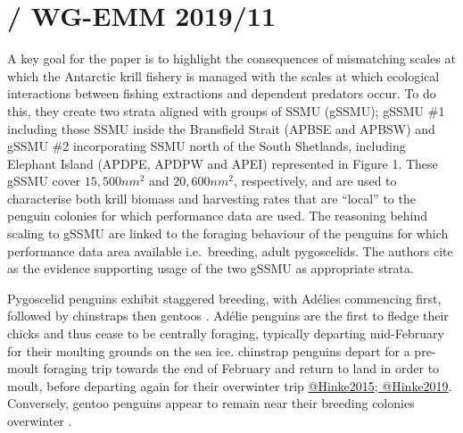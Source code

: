 \documentclass[]{elsarticle} %
\begin{document}
\section{\texorpdfstring{\citet{Watters2020} / WG-EMM
2019/11}{@Watters2020 / WG-EMM 2019/11}}\label{watters2020-wg-emm-201911}

A key goal for the paper is to highlight the consequences of mismatching
scales at which the Antarctic krill fishery is managed with the scales
at which ecological interactions between fishing extractions and
dependent predators occur. To do this, they create two strata aligned
with groups of SSMU (gSSMU); gSSMU \#1 including those SSMU inside the
Bransfield Strait (APBSE and APBSW) and gSSMU \#2 incorporating SSMU
north of the South Shetlands, including Elephant Island (APDPE, APDPW
and APEI) represented in Figure 1. These gSSMU cover \(15,500nm^2\) and
\(20,600nm^2\), respectively, and are used to characterise both krill
biomass and harvesting rates that are ``local'' to the penguin colonies
for which performance data are used. The reasoning behind scaling to
gSSMU are linked to the foraging behaviour of the penguins for which
performance data area available i.e.~breeding, adult pygoscelids. The
authors cite \citet{Hinke2017} as the evidence supporting usage of the
two gSSMU as appropriate strata.

Pygoscelid penguins exhibit staggered breeding, with Adélies commencing
first, followed by chinstraps then gentoos \citep{Black2016}. Adélie
penguins are the first to fledge their chicks and thus cease to be
centrally foraging, typically departing mid-February for their moulting
grounds on the sea ice. chinstrap penguins depart for a pre-moult
foraging trip towards the end of February and return to land in order to
moult, before departing again for their overwinter trip
\href{Figure\%202}{@Hinke2015; @Hinke2019}. Conversely, gentoo penguins
appear to remain near their breeding colonies overwinter
\citep{korczak-abshireCoastalRegionsNorthern2021}.
\end{document}
